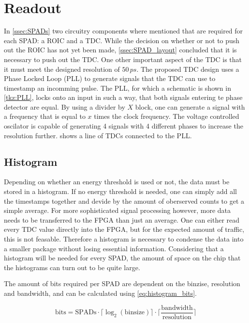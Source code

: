 \section{Readout}\label{ssec:readout}
In \cref{ssec:SPADs} two circuitry components where mentioned that are required for each SPAD: a ROIC and a TDC. While the decision on whether or not to push out the ROIC has not yet been made, \cref{ssec:SPAD_layout} concluded that it is necessary to push out the TDC. One other important aspect of the TDC is that it must meet the designed resolution of $50\,ps$. The proposed TDC design uses a Phase Locked Loop (PLL) to generate signals that the TDC can use to timestamp an incomming pulse. The PLL, for which a schematic is shown in \cref{tkz:PLL}, locks onto an input in such a way, that both signals entering te phase detector are equal. By using a divider by $X$ block, one can generate a signal with a frequency that is equal to $x$ times the clock frequency. The voltage controlled oscilator is capable of generating 4 signals with 4 different phases to increase the resolution further.  shows a line of TDCs connected to the PLL.
		




\subsection{Histogram}
Depending on whether an energy threshold is used or not, the data must be stored in a histogram. If no energy threshold is needed, one can simply add all the timestamps together and devide by the amount of oberserved counts to get a simple  average. For more sophisticated signal processing however, more data needs to be transferred to the FPGA than just an average. One can either read every TDC value directly into the FPGA, but for the expected amount of traffic, this  is not feasable. Therefore a histogram is necessary to condense the data into a smaller package without losing essential information. Considering that a histogram will be needed for every SPAD, the amount of space on the chip that the histograms can turn out to be quite large. 

The amount of bits required per SPAD are dependent on the binzise, resolution and bandwidth, and can be calculated using \cref{eq:histogram_bits}. 

\begin{equation}
		\text{bits} = \text{SPADs}\cdot\lceil \log_2(\text{binsize}) \rceil\cdot \lceil \frac{\text{bandwidth}}{\text{resolution}}\rceil
		\label{eq:histogram_bits}
\end{equation}

